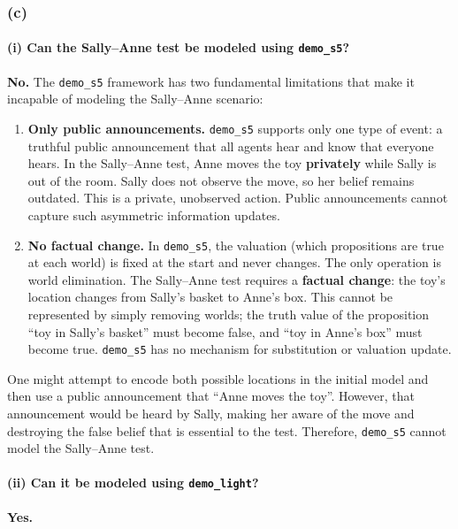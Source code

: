 \subsubsection*{(c)}

\paragraph*{(i) Can the Sally–Anne test be modeled using \texttt{demo\_s5}?}

\textbf{No.} The \texttt{demo\_s5} framework has two 
fundamental limitations that make it incapable of modeling the Sally–Anne scenario:

\begin{enumerate}
    \item \textbf{Only public announcements.}
    \texttt{demo\_s5} supports only one type of event:
    a truthful public announcement that all agents hear and 
    know that everyone hears. In the Sally–Anne test, Anne moves the 
    toy \textbf{privately} while Sally is out of the room. Sally 
    does not observe the move, so her belief remains outdated. 
    This is a private, unobserved action. Public announcements 
    cannot capture such asymmetric information updates.
    
    \item \textbf{No factual change.} 
    In \texttt{demo\_s5}, the valuation 
    (which propositions are true at each world) is fixed at 
    the start and never changes. The only operation is world elimination. 
    The Sally–Anne test requires a \textbf{factual change}: 
    the toy’s location changes from Sally’s basket to Anne’s box. 
    This cannot be represented by simply removing worlds; 
    the truth value of the proposition “toy in Sally’s basket” 
    must become false, and “toy in Anne’s box” must become true. 
    \texttt{demo\_s5} has no mechanism for substitution or valuation update.
\end{enumerate}

One might attempt to encode both possible locations in the initial 
model and then use a public announcement that “Anne moves the toy”. 
However, that announcement would be heard by Sally, making her 
aware of the move and destroying the false belief that is essential 
to the test. Therefore, \texttt{demo\_s5} cannot model the Sally–Anne test.

\paragraph*{(ii) Can it be modeled using \texttt{demo\_light}?}
\textbf{Yes.}

